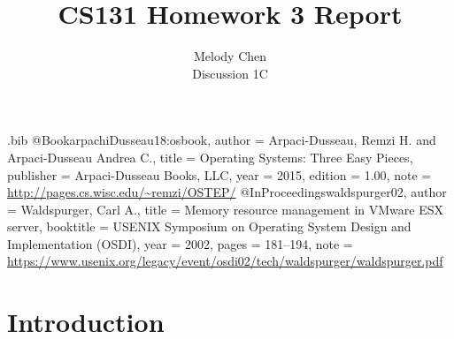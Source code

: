 \usepackage{filecontents}

\begin{filecontents}{\jobname.bib}
@Book{arpachiDusseau18:osbook,
  author =       {Arpaci-Dusseau, Remzi H. and Arpaci-Dusseau Andrea C.},
  title =        {Operating Systems: Three Easy Pieces},
  publisher =    {Arpaci-Dusseau Books, LLC},
  year =         2015,
  edition =      {1.00},
  note =         {\url{http://pages.cs.wisc.edu/~remzi/OSTEP/}}
}
@InProceedings{waldspurger02,
  author =       {Waldspurger, Carl A.},
  title =        {Memory resource management in {VMware ESX} server},
  booktitle =    {USENIX Symposium on Operating System Design and
                  Implementation (OSDI)},
  year =         2002,
  pages =        {181--194},
  note =         {\url{https://www.usenix.org/legacy/event/osdi02/tech/waldspurger/waldspurger.pdf}}}
\end{filecontents}



\date{}

\title{\Large \bf CS131 Homework 3 Report}

\author{
{\rm Melody Chen}\\
Discussion 1C
} %

\maketitle


\section{Introduction}

